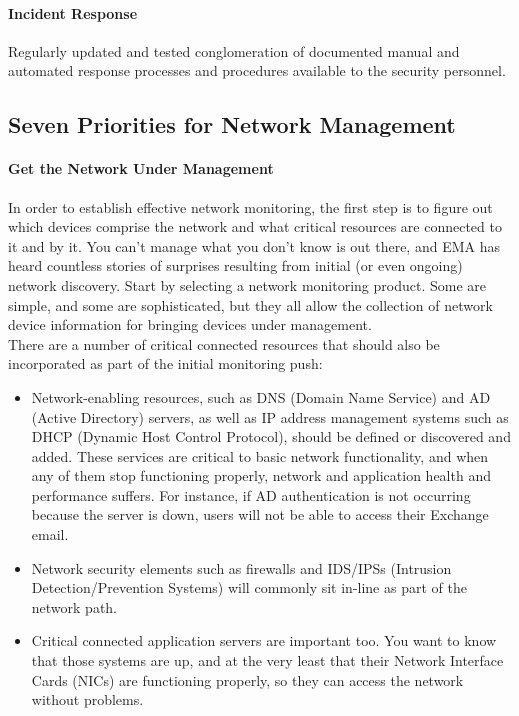 \documentclass[8pt]{extarticle}
\begin{document}
\begin{multicols}{3}
\paragraph{Incident Response} Regularly updated and tested conglomeration of documented manual and
automated response processes and procedures available to the security personnel.


\subsection{Seven Priorities for Network Management}
\paragraph{Get the Network Under Management} In order to establish
effective network monitoring, the first step is to figure out which devices comprise the network and what
critical resources are connected to it and by it. You can’t manage what you don’t know is out there, and
EMA has heard countless stories of surprises resulting from initial (or even ongoing) network discovery.
Start by selecting a network monitoring product. Some are simple, and some are sophisticated, but they
all allow the collection of network device information for bringing devices under management.
\\
There are a number of critical connected resources that
should also be incorporated as part of the initial monitoring push:
\begin{itemize}
    \item Network-enabling resources, such as DNS (Domain Name Service) and AD (Active Directory)
    servers, as well as IP address management systems such as DHCP (Dynamic Host Control
    Protocol), should be defined or discovered and added. These services are critical to basic network
    functionality, and when any of them stop functioning properly, network and application health
    and performance suffers. For instance, if AD authentication is not occurring because the server is
    down, users will not be able to access their Exchange email.
    \item Network security elements such as firewalls and IDS/IPSs (Intrusion Detection/Prevention
    Systems) will commonly sit in-line as part of the network path.
    \item Critical connected application servers are important too. You want to know that those systems are
    up, and at the very least that their Network Interface Cards (NICs) are functioning properly, so
    they can access the network without problems.
\end{itemize}

\end{multicols}
\end{document}
